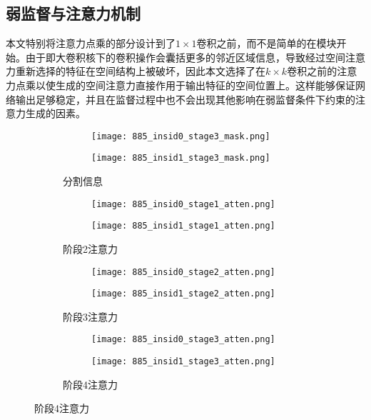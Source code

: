 \subsection{弱监督与注意力机制}
\label{subsec:weaksuper_attention}

本文特别将注意力点乘的部分设计到了$1\times1$卷积之前，而不是简单的在模块开始。由于即大卷积核下的卷积操作会囊括更多的邻近区域信息，导致经过空间注意力重新选择的特征在空间结构上被破坏，因此本文选择了在$k\times k$卷积之前的注意力点乘以使生成的空间注意力直接作用于输出特征的空间位置上。这样能够保证网络输出足够稳定，并且在监督过程中也不会出现其他影响在弱监督条件下约束的注意力生成的因素。

\begin{figure}[h]
	\centering
	\begin{subfigure}{0.23\textwidth}
		\centering
		\begin{subfigure}[b]{\linewidth}
			\texttt{[image: 885\_insid0\_stage3\_mask.png]}
		\end{subfigure}
		\vskip2pt
		\begin{subfigure}[b]{\linewidth}
			\texttt{[image: 885\_insid1\_stage3\_mask.png]}
		\end{subfigure}
		\caption{分割信息}
	\end{subfigure}
	\begin{subfigure}{0.23\textwidth}
		\begin{subfigure}[b]{\linewidth}
			\texttt{[image: 885\_insid0\_stage1\_atten.png]}
		\end{subfigure}
		\vskip2pt
		\begin{subfigure}[b]{\linewidth}
			\texttt{[image: 885\_insid1\_stage1\_atten.png]}
		\end{subfigure}
		\caption{阶段2注意力}
	\end{subfigure}
	\begin{subfigure}{0.23\textwidth}
		\begin{subfigure}[b]{\linewidth}
			\texttt{[image: 885\_insid0\_stage2\_atten.png]}
		\end{subfigure}
		\vskip2pt
		\begin{subfigure}[b]{\linewidth}
			\texttt{[image: 885\_insid1\_stage2\_atten.png]}
		\end{subfigure}
		\caption{阶段3注意力}
	\end{subfigure}
	\begin{subfigure}{0.23\linewidth}
		\centering
		\begin{subfigure}[b]{\linewidth}
			\texttt{[image: 885\_insid0\_stage3\_atten.png]}
		\end{subfigure}
		\vskip2pt
		\begin{subfigure}[b]{\linewidth}
			\texttt{[image: 885\_insid1\_stage3\_atten.png]}
		\end{subfigure}
		\caption{阶段4注意力}
	\end{subfigure}
	\begin{minipage}{0.05\linewidth}
		

\end{minipage}
\end{figure}
